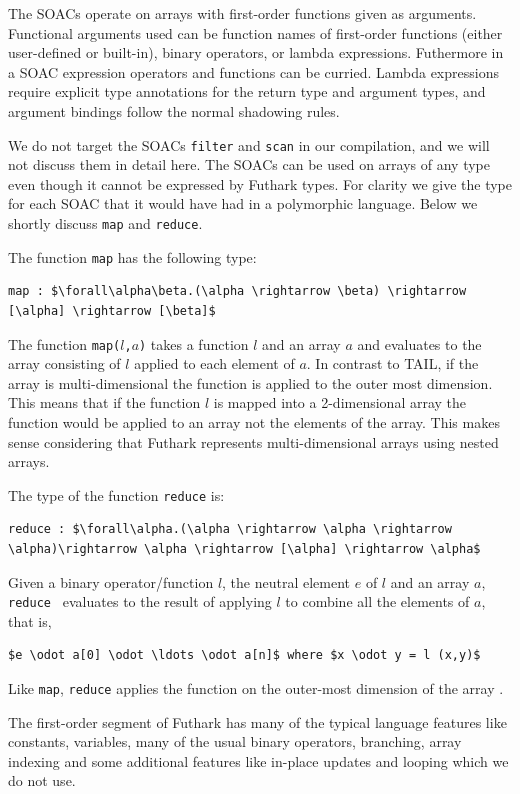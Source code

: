 \documentclass[11pt]{article}
\begin{document}
The SOACs operate on arrays with first-order functions given as arguments.
Functional arguments used can be function names of first-order functions (either user-defined or built-in), 
binary operators, or lambda expressions.
Futhermore in a SOAC expression operators and functions can be curried. Lambda expressions require explicit type annotations for
the return type and argument types, and argument bindings follow the normal shadowing rules.

We do not target the SOACs {\tt filter} and {\tt scan} in our compilation, and we will not discuss them in detail here.
The SOACs can be used on arrays of any type even though it cannot be expressed by Futhark types.
For clarity we give the type for each SOAC that it would have had in a polymorphic language.
Below we shortly discuss {\tt map} and {\tt reduce}.

The function {\tt map} has the following type: 
\begin{lstlisting}[numbers=none,frame=none]
map : $\forall\alpha\beta.(\alpha \rightarrow \beta) \rightarrow [\alpha] \rightarrow [\beta]$
\end{lstlisting}
The function {\tt map($l$,$a$)} takes a function $l$ and an array $a$ and evaluates to the array consisting of $l$ applied to each element of $a$.
In contrast to TAIL, if the array is multi-dimensional the function is applied to the outer most dimension.
This means that if the function $l$ is mapped into a 2-dimensional array the function would be applied to an array not the elements
of the array. This makes sense considering that Futhark represents multi-dimensional arrays using nested arrays.

The type of the function {\tt reduce} is: 
\begin{lstlisting}[numbers=none,frame=none]
reduce : $\forall\alpha.(\alpha \rightarrow \alpha \rightarrow \alpha)\rightarrow \alpha \rightarrow [\alpha] \rightarrow \alpha$
\end{lstlisting}
Given a binary operator/function $l$, the neutral element $e$ of $l$ and an array $a$,
{\tt reduce } evaluates to the result of applying $l$ to combine all the elements of $a$, that is,
\begin{lstlisting}[numbers=none,frame=none]
$e \odot a[0] \odot \ldots \odot a[n]$ where $x \odot y = l (x,y)$
\end{lstlisting}
Like {\tt map}, {\tt reduce} applies the function on the outer-most dimension of the array \cite{TroelsHenriksen}.

The first-order segment of Futhark has many of the typical language features like constants, variables, many of the usual binary operators, branching, array indexing and some additional features like in-place updates and looping which we do not use.
\end{document}
